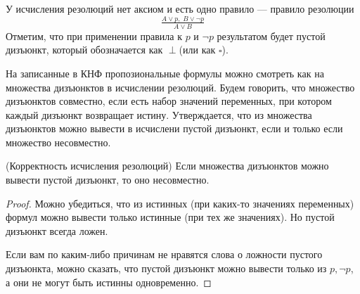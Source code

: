 \documentclass{article}
\begin{document}
У исчисления резолюций нет аксиом и есть одно правило --- правило резолюции
\[\tfrac{A \lor p, \; B \lor \lnot p}{A \lor B} \]
Отметим, что при применении правила к $p$ и $\lnot p$ результатом будет пустой дизъюнкт, который обозначается как $\perp$(или как $\square$). 

На записанные в КНФ пропозиональные формулы можно смотреть как на множества дизъюнктов в исчислении резолюций. Будем говорить, что множество дизъюнктов совместно, если есть набор значений переменных, при котором каждый дизъюнкт возвращает истину. Утверждается, что из множества дизъюнктов можно вывести в исчислени пустой дизъюнкт, если и только если множество несовместно.

\begin{theorem}{(Корректность исчисления резолюций)}
	Если множества дизъюнктов можно вывести пустой дизъюнкт, то оно несовместно.
\end{theorem}
\begin{proof}
	Можно убедиться, что из истинных (при каких-то значениях переменных) формул можно вывести только истинные (при тех же значениях). Но пустой дизъюнкт всегда ложен.

	Если вам по каким-либо причинам не нравятся слова о ложности пустого дизъюнкта, можно сказать, что пустой дизъюнкт можно вывести только из $p, \lnot p$, а они не могут быть истинны одновременно.
\end{proof}
\end{document}
